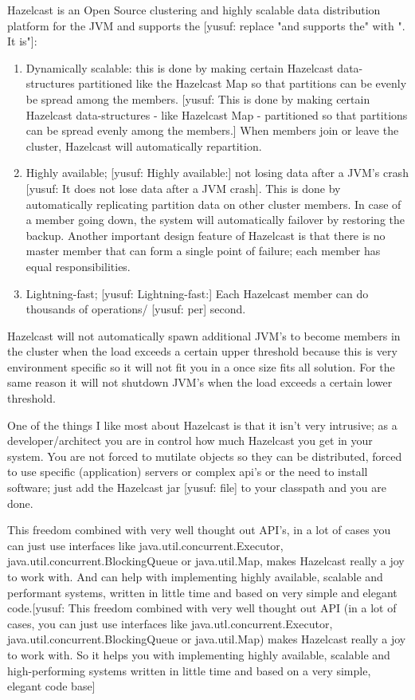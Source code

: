 Hazelcast is an Open Source clustering and highly scalable data distribution platform for the JVM and supports the [yusuf: replace "and supports the" with ". It is"]:
\begin{enumerate}
\item Dynamically scalable: this is done by making certain Hazelcast data-structures partitioned like the Hazelcast Map so that partitions can be evenly be spread among the members.  [yusuf: This is done by making certain Hazelcast data-structures - like Hazelcast Map - partitioned so that partitions can be spread evenly among the members.] When members join or leave the cluster, Hazelcast will automatically repartition.
\item Highly available; [yusuf: Highly available:] not losing data after a JVM's crash [yusuf: It does not lose data after a JVM crash]. This is done by automatically replicating partition data on other cluster members. In case of a member going down, the system will automatically failover by restoring the backup. Another important design feature of Hazelcast is that there is no master member that can form a single point of failure; each member has equal responsibilities.
\item Lightning-fast; [yusuf: Lightning-fast:] Each Hazelcast member can do thousands of operations/ [yusuf: per] second.
\end{enumerate}
Hazelcast will not automatically spawn additional JVM's to become members in the cluster when the load exceeds a certain upper threshold because this is very environment specific so it will not fit you in a once size fits all solution. For the same reason it will not shutdown JVM's when the load exceeds a certain lower threshold.

One of the things I like most about Hazelcast is that it isn't very intrusive; as a developer/architect you are in control how much Hazelcast you get in your system. You are not forced to mutilate objects so they can be distributed, forced to use specific (application) servers or complex api's or the need to install software; just add the Hazelcast jar [yusuf: file] to your classpath and you are done.

This freedom combined with very well thought out API's, in a lot of cases you can just use interfaces like java.util.concurrent.Executor, java.util.concurrent.BlockingQueue or java.util.Map, makes Hazelcast really a joy to work with. And can help with implementing highly available, scalable and performant systems, written in little time and based on very simple and elegant code.[yusuf: This freedom combined with very well thought out API (in a lot of cases, you can just use interfaces like java.utl.concurrent.Executor, java.util.concurrent.BlockingQueue or java.util.Map) makes Hazelcast really a joy to work with. So it helps you with implementing highly available, scalable and high-performing systems written in little time and based on a very simple, elegant code base]
 

